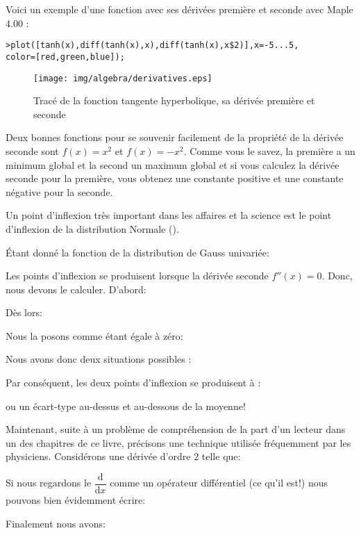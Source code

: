	Voici un exemple d'une fonction avec ses dérivées première et seconde avec Maple 4.00 :

	\texttt{>plot([tanh(x),diff(tanh(x),x),diff(tanh(x),x\$2)],x=-5...5,\\color=[red,green,blue]);}

	\begin{figure}[H]
		\centering
		\texttt{[image: img/algebra/derivatives.eps]}
		\caption{Tracé de la fonction tangente hyperbolique, sa dérivée première et seconde}
	\end{figure}

	\begin{tcolorbox}[title=Remarque,colframe=black,arc=10pt]
	Deux bonnes fonctions pour se souvenir facilement de la propriété de la dérivée seconde sont $f(x)=x^2$ et $f(x)=-x^2$. Comme vous le savez, la première a un minimum global et la second un maximum global et si vous calculez la dérivée seconde pour la première, vous obtenez une constante positive et une constante négative pour la seconde.
	\end{tcolorbox}
	
	Un point d'inflexion très important dans les affaires et la science est le point d'inflexion de la distribution Normale ().
	
	Étant donné la fonction de la distribution de Gauss univariée:
	
	Les points d'inflexion se produisent lorsque la dérivée seconde $f''(x)=0$. Donc, nous devons le calculer. D'abord:
	
	Dès lors:
	
	Nous la posons comme étant égale à zéro:
	
	Nous avons donc deux situations possibles :
	
	Par conséquent, les deux points d'inflexion se produisent à :
	
	ou un écart-type au-dessus et au-dessous de la moyenne!

	Maintenant, suite à un problème de compréhension de la part d'un lecteur dans un des chapitres de ce livre, précisons une technique utilisée fréquemment par les physiciens. Considérons une dérivée d'ordre $2$ telle que:
	
	Si nous regardons le  $\dfrac{\mathrm{d}}{\mathrm{d}x}$ comme un opérateur différentiel (ce qu'il est!) nous pouvons bien évidemment écrire:
	
	Finalement nous avons:
	
